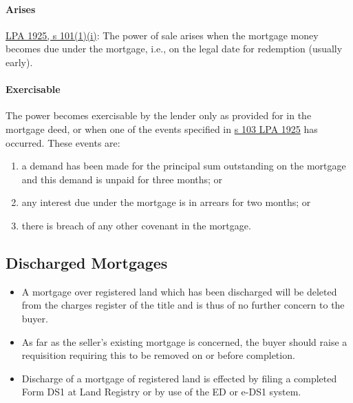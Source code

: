 \documentclass[
]{article}
\providecommand{\tightlist}{%
  \setlength{\itemsep}{0pt}\setlength{\parskip}{0pt}}
\begin{document}
\hypertarget{arises}{%
\paragraph{Arises}\label{arises}}

\href{https://www.legislation.gov.uk/ukpga/Geo5/15-16/20/section/101}{LPA
1925, s 101(1)(i)}: The power of sale arises when the mortgage money
becomes due under the mortgage, i.e., on the legal date for redemption
(usually early).

\hypertarget{exercisable}{%
\paragraph{Exercisable}\label{exercisable}}

The power becomes exercisable by the lender only as provided for in the
mortgage deed, or when one of the events specified in
\href{https://www.legislation.gov.uk/ukpga/Geo5/15-16/20/section/103}{s
103 LPA 1925} has occurred. These events are:

\begin{enumerate}
\def\labelenumi{\arabic{enumi}.}
\tightlist
\item
  a demand has been made for the principal sum outstanding on the
  mortgage and this demand is unpaid for three months; or
\item
  any interest due under the mortgage is in arrears for two months; or
\item
  there is breach of any other covenant in the mortgage.
\end{enumerate}

\hypertarget{discharged-mortgages}{%
\subsection{Discharged Mortgages}\label{discharged-mortgages}}

\begin{itemize}
\tightlist
\item
  A mortgage over registered land which has been discharged will be
  deleted from the charges register of the title and is thus of no
  further concern to the buyer.
\item
  As far as the seller's existing mortgage is concerned, the buyer
  should raise a requisition requiring this to be removed on or before
  completion.
\item
  Discharge of a mortgage of registered land is effected by filing a
  completed Form DS1 at Land Registry or by use of the ED or e-DS1
  system.
\end{itemize}
\end{document}
